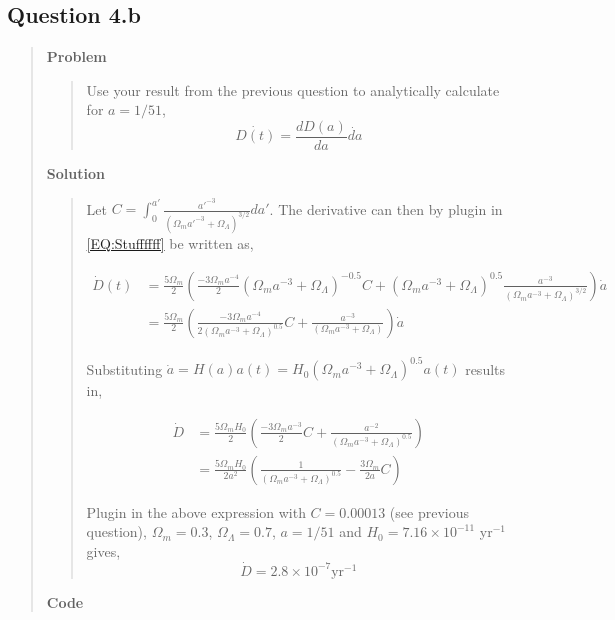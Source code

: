 
\subsection*{\textbf{Question 4.b}}
\begin{quote}

\textbf{Problem}
\begin{quote} 
Use your result from the previous question to analytically calculate for $a = 1/51$,
\begin{equation}
\dot{D(t)} = \frac{dD(a)}{da}\dot{da}
\end{equation}
\end{quote}

\textbf{Solution} 
\begin{quote}
Let $C = \int_{0}^{a'} \frac{a'^{-3}}{\left( \Omega_m a'^{-3} + \Omega_{\Lambda} \right)^{3/2}} da'$. The derivative can then by plugin in \ref{EQ:Stuffffff} be written as,

\begin{align}
\dot{D}(t) &= \frac{5 \Omega_m}{2} \left( \frac{-3 \Omega_m a^{-4}}{2} \left(\Omega_m a^{-3} + \Omega_{\Lambda} \right)^{-0.5}C + \left(\Omega_m a^{-3} + \Omega_{\Lambda} \right)^{0.5} \frac{a^{-3}}{\left( \Omega_m a^{-3} + \Omega_{\Lambda} \right)^{3/2} }  \right) \dot{a} \\
&= \frac{5 \Omega_m}{2} \left( \frac{-3 \Omega_m a^{-4}}{2 \left(\Omega_m a^{-3} + \Omega_{\Lambda} \right)^{0.5}}C + \frac{a^{-3}}{\left( \Omega_m a^{-3} + \Omega_{\Lambda} \right)} \right) \dot{a}
\end{align}

Substituting $\dot{a} = H(a)a(t) = H_0 \left(\Omega_m a^{-3}  + \Omega_{\Lambda} \right)^{0.5}a(t)$ results in,

\begin{align}
\dot{D} &= \frac{5 \Omega_m H_0}{2} \left( \frac{-3 \Omega_m a^{-3}}{2}C + \frac{a^{-2}}{\left( \Omega_m a^{-3} + \Omega_{\Lambda} \right)^{0.5}}  \right)  \\
&= \frac{5 \Omega_m H_0}{2 a^2} \left( \frac{1}{\left(\Omega_m a^{-3} + \Omega_{\Lambda} \right)^{0.5}} - \frac{3\Omega_m}{2a} C \right)
\end{align}

Plugin in the above expression with $ C = 0.00013$ (see previous question), $\Omega_{m} = 0.3$, $\Omega_{\Lambda} = 0.7$, $a = 1/51$ and $H_0 = 7.16 \times 10^{-11} $ yr$^{-1}$ gives,
\begin{equation}
\dot{D} = 2.8 \times 10^{-7} \text{yr}^{-1}
\end{equation}

\end{quote}

\textbf{Code}
\end{quote}





